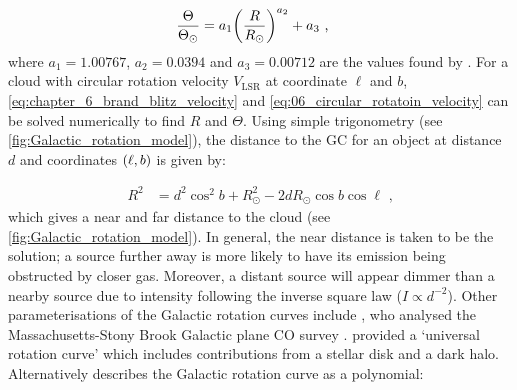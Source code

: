 \begin{equation}
    \begin{aligned}
        \frac{\Theta}{\Theta_\odot}&=a_1 \qty(\frac{R}{R_\odot})^{a_2}+a_3\text{ ,}
    \end{aligned} \label{eq:06_circular_rotatoin_velocity}
\end{equation}
\noindent where $a_1=1.00767$, $a_2=0.0394$ and $a_3=0.00712$ are the values found by \cite{1993A&A...275...67B}. For a cloud with circular rotation velocity $V_\text{LSR}$ at coordinate $\ell$ and $b$, \autoref{eq:chapter_6_brand_blitz_velocity} and \autoref{eq:06_circular_rotatoin_velocity} can be solved numerically to find $R$ and $\Theta$. Using simple trigonometry (see \autoref{fig:Galactic_rotation_model}), the distance to the GC for an object at distance $d$ and coordinates $\qty(\ell,b)$ is given by:

\begin{equation}
    \begin{aligned}
        R^2&=d^2\cos^2b+R_\odot^2-2dR_\odot\cos b\cos\ell\text{ ,}
    \end{aligned}
\end{equation}
\noindent which gives a near and far distance to the cloud (see \autoref{fig:Galactic_rotation_model}). In general, the near distance is taken to be the solution; a source further away is more likely to have its emission being obstructed by closer gas. Moreover, a distant source will appear dimmer than a nearby source due to intensity following the inverse square law ($I\propto d^{-2}$).
\newpar 
Other parameterisations of the Galactic rotation curves include \cite{1985ApJ...295..422C}, who analysed the Massachusetts-Stony Brook Galactic plane CO survey \citep{1985ApJ...289..373S}. \cite{1996MNRAS.281...27P} provided a `universal rotation curve' which includes contributions from a stellar disk and a dark halo. Alternatively \cite{2014ApJ...783..130R} describes the Galactic rotation curve as a polynomial:

